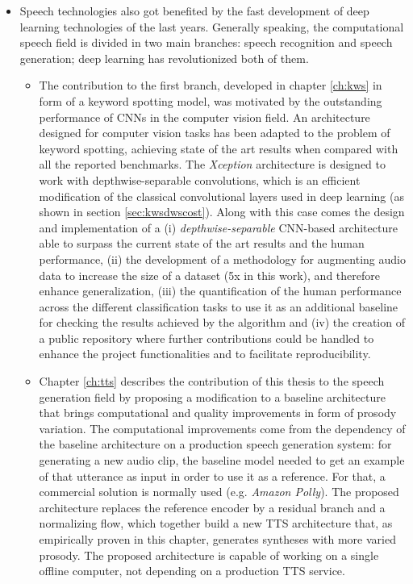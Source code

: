 \begin{itemize}
\item Speech technologies also got benefited by the fast development of deep learning technologies of the last years. Generally speaking, the computational speech field is divided in two main branches: speech recognition and speech generation; deep learning has revolutionized both of them. 
	\begin{itemize}
		\item The contribution to the first branch, developed in chapter \ref{ch:kws} in form of a keyword spotting model, was motivated by the outstanding performance of CNNs in the computer vision field. An architecture designed for computer vision tasks has been adapted to the problem of keyword spotting, achieving state of the art results when compared with all the reported benchmarks. The \textit{Xception} architecture is designed to work with depthwise-separable convolutions, which is an efficient modification of the classical convolutional layers used in deep learning (as shown in section \ref{sec:kwsdwscost}). Along with this case comes the design and implementation of a (i) \textit{depthwise-separable} CNN-based architecture able to surpass the current state of the art results and the human performance, (ii) the development of a methodology for augmenting audio data to increase the size of a dataset (5x in this work), and therefore enhance generalization, (iii) the quantification of the human performance across the different classification tasks to use it as an additional baseline for checking the results achieved by the algorithm and (iv) the creation of a public repository where further contributions could be handled to enhance the project functionalities and to facilitate reproducibility.
		\item Chapter \ref{ch:tts} describes the contribution of this thesis to the speech generation field by proposing a modification to a baseline architecture that brings computational and quality improvements in form of prosody variation. The computational improvements come from the dependency of the baseline architecture on a production speech generation system: for generating a new audio clip, the baseline model needed to get an example of that utterance as input in order to use it as a reference. For that, a commercial solution is normally used (e.g. \textit{Amazon Polly}). The proposed architecture replaces the reference encoder by a residual branch and a normalizing flow, which together build a new TTS architecture that, as empirically proven in this chapter, generates syntheses with more varied prosody. The proposed architecture is capable of working on a single offline computer, not depending on a production TTS service. 
	\end{itemize}
\end{itemize}


